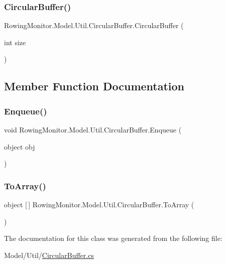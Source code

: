 \subsubsection{\texorpdfstring{Circular\+Buffer()}{CircularBuffer()}}
{\footnotesize\ttfamily Rowing\+Monitor.\+Model.\+Util.\+Circular\+Buffer.\+Circular\+Buffer (\begin{DoxyParamCaption}\item[{int}]{size }\end{DoxyParamCaption})}



\subsection{Member Function Documentation}
\mbox{\label{class_rowing_monitor_1_1_model_1_1_util_1_1_circular_buffer_af301723b675ac785291d5d234c5557c7}} 
\subsubsection{\texorpdfstring{Enqueue()}{Enqueue()}}
{\footnotesize\ttfamily void Rowing\+Monitor.\+Model.\+Util.\+Circular\+Buffer.\+Enqueue (\begin{DoxyParamCaption}\item[{object}]{obj }\end{DoxyParamCaption})}

\mbox{\label{class_rowing_monitor_1_1_model_1_1_util_1_1_circular_buffer_a63e22497a191f7a4352e5aed13ce7e4a}} 
\subsubsection{\texorpdfstring{To\+Array()}{ToArray()}}
{\footnotesize\ttfamily object \mbox{[}$\,$\mbox{]} Rowing\+Monitor.\+Model.\+Util.\+Circular\+Buffer.\+To\+Array (\begin{DoxyParamCaption}{ }\end{DoxyParamCaption})}



The documentation for this class was generated from the following file\+:\begin{DoxyCompactItemize}
\item 
Model/\+Util/\hyperlink{_circular_buffer_8cs}{Circular\+Buffer.\+cs}\end{DoxyCompactItemize}
